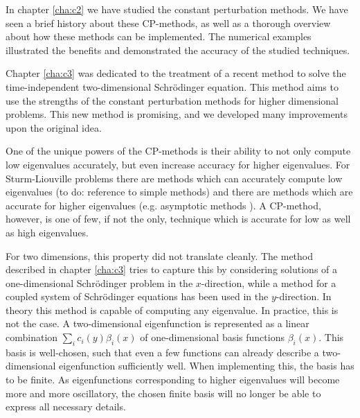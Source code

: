 

\label{cha:c4}

In chapter \ref{cha:c2} we have studied the constant perturbation methods. We have seen a brief history about these CP-methods, as well as a thorough overview about how these methods can be implemented. The numerical examples illustrated the benefits and demonstrated the accuracy of the studied techniques.

Chapter \ref{cha:c3} was dedicated to the treatment of a recent method to solve the time-independent two-dimensional Schrödinger equation. This method aims to use the strengths of the constant perturbation methods for higher dimensional problems. This new method is promising, and we developed many improvements upon the original idea.

One of the unique powers of the CP-methods is their ability to not only compute low eigenvalues accurately, but even increase accuracy for higher eigenvalues. For Sturm-Liouville problems there are methods which can accurately compute low eigenvalues ({\color{red}to do: reference to simple methods}) and there are methods which are accurate for higher eigenvalues (e.g. asymptotic methods \cite{kuzmina_asymptotic_2000,zhukova_asymptotic_2020}). A CP-method, however, is one of few, if not the only, technique which is accurate for low as well as high eigenvalues.

For two dimensions, this property did not translate cleanly. The method described in chapter \ref{cha:c3} tries to capture this by considering solutions of a one-dimensional Schrödinger problem in the $x$-direction, while a method for a coupled system of Schrödinger equations has been used in the $y$-direction. In theory this method is capable of computing any eigenvalue. In practice, this is not the case. A two-dimensional eigenfunction is represented as a linear combination $\sum_{i} c_i(y) \beta_i(x)$ of one-dimensional basis functions $\beta_i(x)$. This basis is well-chosen, such that even a few functions can already describe a two-dimensional eigenfunction sufficiently well. When implementing this, the basis has to be finite. As eigenfunctions corresponding to higher eigenvalues will become more and more oscillatory, the chosen finite basis will no longer be able to express all necessary details.

